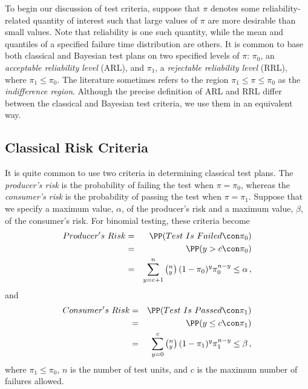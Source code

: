 \documentclass {book}
\begin{document}
To begin our discussion of test criteria, suppose that $\pi$
denotes some reliability-related quantity of interest such that
large values of $\pi$ are more desirable than small values. Note
that reliability is one such quantity, while the mean and
quantiles of a specified failure time distribution are others. It
is common to base both classical and Bayesian test plans on two
specified levels of $\pi$: $\pi_0$, an \emph{acceptable
reliability level} (ARL), and $\pi_1$, a \emph{rejectable
reliability level} (RRL), where $\pi_1 \leq  \pi_0$. The
literature sometimes refers to the region $\pi_1 \leq \pi \leq
\pi_0$ as the \emph{indifference region}. Although the precise definition of ARL and RRL differ
between the classical and Bayesian test criteria, we use them in
an equivalent way.

\subsection{Classical Risk Criteria}\label{ch10:sec1:ss1}
It is quite common to use two criteria in determining classical
test plans. The \emph{producer's risk}
 is the probability of failing the
test when $\pi = \pi_0$, whereas the \emph{consumer's risk}
 is the probability of passing the
test when $\pi = \pi_1$.
 Suppose
that we specify a maximum value, $\alpha$, of the producer's risk
and a maximum value, $\beta$, of the consumer's risk. For binomial
testing, these criteria become
\begin{eqnarray}\label{ch10:eqn1}
Producer's\mbox{ }Risk & = & \PP (Test\mbox{ }Is\mbox{ }Failed
\con \pi_{0})\\
& = & \PP (y>c \con\pi_0)\nonumber\\
& = &
\sum_{y=c+1}^{n}\left(_y^n\right)(1-\pi_{0})^{y}\pi_{0}^{n-y} \leq
\alpha \, , \nonumber
\end{eqnarray}
and
\begin{eqnarray}\label{ch10:eqn2}
Consumer's\mbox{ }Risk & = & \PP( Test\mbox{ }Is\mbox{
}Passed \con \pi_1)\\
& = & \PP(y \leq c \con\pi_1) \nonumber\\
& = & \sum_{y=0}^{c} \left(_y^n\right)(1-\pi_{1})^
{y}\pi_{1}^{n-y} \leq \beta \, , \nonumber
\end{eqnarray}
where $\pi_1 \leq \pi_0$, $n$ is the number of test units, and $c$
is the maximum number of failures allowed.
\end{document}
